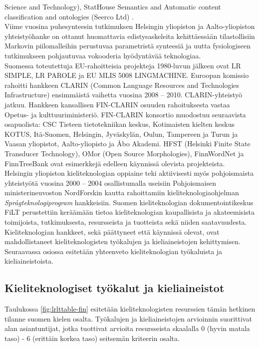 \begin{multicols}{2}
Science and Technology), StatHouse Semantics and Automatic content
classification and ontologies (Seerco Ltd) \cite{LoppuFENIX}.\\
Viime vuosina puhesynteesin tutkimuksen Helsingin yliopiston ja
Aalto-yliopiston yhteistyöhanke on ottanut huomattavia
edistysaskeleita kehittäessään tilastollisiin Markovin piilomalleihin
perustuvaa parametristä synteesiä ja uutta fysiologiseen tutkimukseen
pohjautuvaa vokooderia hyödyntävää teknologiaa.\\
Suomessa toteutettuja EU-rahoitteisia projekteja 1980-luvun jälkeen
ovat LR SIMPLE, LR PAROLE ja EU MLIS 5008 LINGMACHINE. Euroopan
komissio rahoitti hankkeen CLARIN (Common Language Resources and
Technologies Infrastructure) ensimmäistä vaihetta vuosina 2008 –
2010. CLARIN-yhteistyö jatkuu. Hankkeen kansallisen FIN-CLARIN osuuden
rahoituksesta vastaa Opetus- ja kulttuuriministeriö. FIN-CLARIN
konsortio muodostuu seuraavista osapuolista: CSC Tieteen
tietotekniikan keskus, Kotimaisten kielten keskus KOTUS,
Itä-Suomen, Helsingin, Jyväskylän, Oulun, Tampereen ja Turun ja Vaasan
yliopistot, Aalto-yliopisto ja Åbo Akademi. HFST (Helsinki Finite
State Transducer Technology), OMor (Open Source Morphologies),
FinnWordNet ja FinnTreeBank ovat esimerkkejä edelleen käynnissä
olevista projekteista.\\
Helsingin yliopiston kieliteknologian oppiaine teki aktiivisesti myös
pohjoismaista yhteistyötä vuosina 2000 – 2004 osallistumalla
useisiin Pohjoismaisen ministerineuvoston NordForskin kautta
rahoittamiin kieliteknologiaohjelman \textit{Språgteknologiprogram}
hankkeisiin. Suomen kieliteknologian dokumentointikeskus FiLT
perustettiin keräämään tietoa kieliteknologian kaupallisista ja
akateemisista toimijoista, tutkimuksesta, resursseista ja tuotteista
sekä niiden saatavuudesta.\\
Kieliteknologian hankkeet, sekä päättyneet että käynnissä olevat, ovat
mahdollistaneet kieliteknologisten työkalujen ja kieliaineistojen
kehittymisen.  Seuraavassa osiossa esitetään yhteenveto
kieliteknologian työkaluista ja kieliaineistoista.


\subsection{Kieliteknologiset työkalut ja kieliaineistot}


Taulukossa \ref{fig:lrlttable-fin} esitetään kieliteknologisten
resurssien tämän hetkinen tilanne suomen kielen osalta. Työkalujen ja
kieliaineistojen arvioinnin suorittivat alan asiantuntijat, jotka
tuottivat arvioita resursseista skaalalla 0 (hyvin matala taso) - 6
(erittäin korkea taso) seitsemän kriteerin osalta.


\end{multicols}
